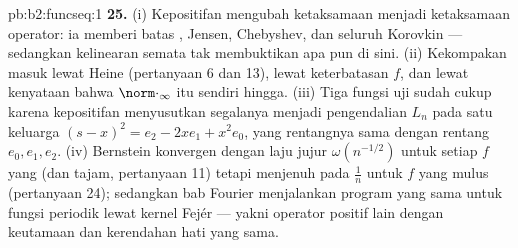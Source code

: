 \begin{solution}{pb:b2:funcseq:1}
\textbf{25.} (i) Kepositifan mengubah ketaksamaan 
menjadi ketaksamaan operator: ia memberi batas , Jensen,
Chebyshev, dan seluruh Korovkin --- sedangkan kelinearan semata tak
membuktikan apa pun di sini. (ii) Kekompakan masuk lewat Heine
(pertanyaan 6 dan 13), lewat keterbatasan $f$, dan lewat kenyataan bahwa
 $\norm\cdot_\infty$ itu sendiri hingga. (iii) Tiga fungsi uji
sudah cukup karena kepositifan menyusutkan segalanya menjadi
pengendalian $L_n$ pada satu keluarga $(s-x)^2 = e_2 - 2xe_1 + x^2e_0$,
yang rentangnya sama dengan rentang $e_0, e_1, e_2$. (iv) Bernstein
konvergen dengan laju jujur $\omega(n^{-1/2})$ untuk setiap $f$ yang
 (dan tajam, pertanyaan 11) tetapi menjenuh pada $\frac1n$ untuk
$f$ yang mulus (pertanyaan 24); sedangkan bab Fourier menjalankan
program yang sama untuk fungsi periodik lewat kernel Fejér --- yakni
operator positif lain dengan keutamaan dan kerendahan hati yang sama.

\end{solution}
